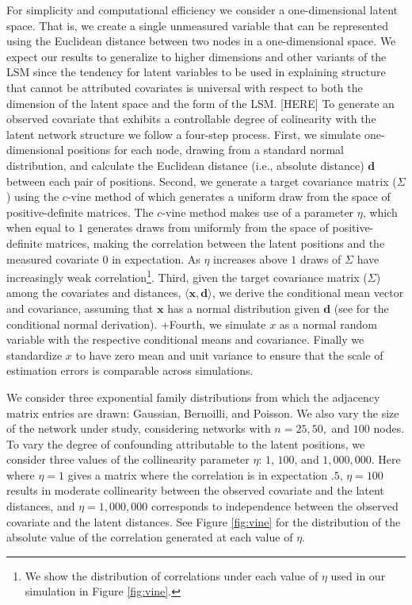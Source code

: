 \documentclass[11pt]{article}
\begin{document}
For simplicity and computational efficiency we consider a one-dimensional latent space. That is, we create a single unmeasured variable that can be represented using the Euclidean distance between two nodes in a one-dimensional space. We expect our results to generalize to higher dimensions and other variants of the LSM since the tendency for latent variables to be used in explaining structure that cannot be attributed covariates is universal with respect to both the dimension of the latent space and the form of the LSM. [HERE] To generate an observed covariate that exhibits a controllable degree of colinearity with the latent network structure we follow a four-step process. First, we simulate one-dimensional positions for each node, drawing from a standard normal distribution, and calculate the Euclidean distance (i.e., absolute distance) $\mathbf{d}$ between each pair of positions. Second, we generate a target covariance matrix ($\Sigma$) using the $c$-vine method of \cite{lewandowski2009generating} which generates a uniform draw from the space of positive-definite matrices. The $c$-vine method makes use of a parameter $\eta$, which when equal to $1$ generates draws from uniformly from the space of positive-definite matrices, making the correlation between the latent positions and the measured covariate 0 in expectation. As $\eta$ increases above $1$ draws of $\Sigma$ have increasingly weak correlation\footnote{We show the distribution of correlations under each value of $\eta$ used in our simulation in Figure \ref{fig:vine}.}. Third, given the target covariance matrix ($\Sigma$) among the covariates and distances, $\langle \mathbf{x}, \mathbf{d} \rangle$, we derive the conditional mean vector and covariance, assuming that $\mathbf{x}$ has a normal distribution given $\mathbf{d}$ (see \cite[pp. 116--117]{eaton1983} for the conditional normal derivation).
+Fourth, we simulate $x$ as a normal random variable with the respective conditional means and covariance. Finally we standardize $x$ to have zero mean and unit variance to ensure that the scale of estimation errors is comparable across simulations.

We consider three exponential family distributions from which the adjacency matrix entries are drawn: Gaussian, Bernoilli, and Poisson. We also vary the size of the network under study, considering networks with $n = 25, 50,$ and $100$ nodes. To vary the degree of confounding attributable to the latent positions, we consider three values of the collinearity parameter $\eta$: $1$, $100$, and $1,000,000$. Here  where $\eta = 1$ gives a matrix where the correlation is in expectation $.5$, $\eta = 100$ results in moderate collinearity between the observed covariate and the latent distances, and $\eta = 1,000,000$ corresponds to independence between the observed covariate and the latent distances. See Figure \ref{fig:vine} for the distribution of the absolute value of the correlation generated at each value of $\eta$.
\end{document}
